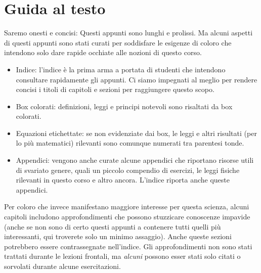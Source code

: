 \chapter*{Guida al testo}
Saremo onesti e concisi: Questi appunti sono lunghi e prolissi.
Ma alcuni aspetti di questi appunti sono
stati curati per soddisfare le esigenze di coloro che intendono solo dare rapide
occhiate alle nozioni di questo corso.

\begin{itemize}
    \item Indice: l'indice è la prima arma a portata di studenti che intendono
    consultare rapidamente gli appunti. Ci siamo impegnati al meglio per rendere
    concisi i titoli di capitoli e sezioni per raggiungere questo scopo.

    \item Box colorati: definizioni, leggi e principi notevoli sono risaltati
    da box colorati.
    
    \item Equazioni etichettate: se non evidenziate dai box, le leggi e altri
    risultati (per lo più matematici) rilevanti sono comunque numerati tra
    parentesi tonde.

    \item Appendici: vengono anche curate alcune appendici che riportano risorse
    utili di svariato genere, quali un piccolo compendio di esercizi, le leggi
    fisiche rilevanti in questo corso e altro ancora. L'indice riporta anche
    queste appendici.
\end{itemize}

Per coloro che invece manifestano maggiore interesse per questa scienza, alcuni
capitoli includono approfondimenti che possono stuzzicare conoscenze impavide (anche
se non sono di certo questi appunti a contenere tutti quelli più interessanti,
qui troverete solo un minimo assaggio). Anche queste sezioni potrebbero essere
contrassegnate nell'indice.
Gli approfondimenti non sono stati trattati durante le lezioni frontali, ma
\textit{alcuni} possono esser stati solo citati o sorvolati durante alcune
esercitazioni.

